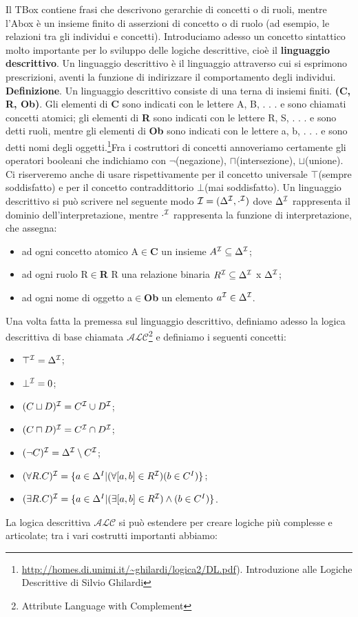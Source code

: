 \documentclass[a4paper,11pt]{article}
\newcommand{\alc}{%
   \ensuremath{\mathcal{ALC}}\xspace}
\newcommand{\I}{%
        \ensuremath{\mathcal{I}}\xspace}
\begin{document}
Il TBox contiene frasi che descrivono gerarchie di concetti o di ruoli, mentre l'Abox è un insieme finito di asserzioni di concetto o di ruolo (ad esempio, le relazioni tra gli individui e concetti).
Introduciamo adesso un concetto sintattico molto importante per lo sviluppo delle logiche descrittive, cioè il \textbf{linguaggio descrittivo}.
Un linguaggio descrittivo è il linguaggio attraverso cui si esprimono prescrizioni, aventi la funzione di indirizzare il comportamento degli individui. \newline
\textbf{Definizione}. \newline Un linguaggio descrittivo consiste di una terna di insiemi finiti. \textbf{(C, R, Ob)}. Gli elementi di \textbf{C} sono indicati con le lettere A, B, . . . e sono chiamati concetti atomici; gli elementi di \textbf{R} sono indicati con le lettere R, S, . . . e sono detti
ruoli, mentre gli elementi di \textbf{Ob} sono indicati con le lettere a, b, . . . e sono detti nomi degli oggetti.\footnote{ \url{http://homes.di.unimi.it/~ghilardi/logica2/DL.pdf}). Introduzione alle Logiche Descrittive di Silvio Ghilardi}\newpage Fra i costruttori di concetti annoveriamo certamente gli operatori booleani che indichiamo con $\neg$(negazione), $\sqcap$(intersezione), $\sqcup$(unione). \newline Ci riserveremo anche di usare rispettivamente per il concetto universale $\top$(sempre soddisfatto) e  per il concetto contraddittorio $\bot$(mai soddisfatto).\newline
Un linguaggio descrittivo si può scrivere nel seguente modo $\I = (\Delta^\I,\cdot^\I)$ dove $\Delta^\I$ rappresenta il dominio dell'interpretazione, 
mentre $\cdot^\I$ rappresenta la funzione di interpretazione, che assegna:
\begin{itemize}
	\item ad ogni concetto atomico A$\in$\textbf{C} un insieme  $A^{\I}\subseteq \Delta^\I$;
	\item ad ogni ruolo R$\in$\textbf{R} R una relazione binaria $R^{\I}\subseteq 	\Delta^{\I}$ x $\Delta^{\I} $;
	\item ad ogni nome di oggetto a$\in$\textbf{Ob} un elemento $a^{\I}\in \Delta^\I$.
\end{itemize}  Una volta fatta la premessa sul linguaggio descrittivo, definiamo adesso la logica descrittiva di base chiamata $\alc$\footnote{Attribute Language with Complement} e definiamo i seguenti concetti:
\begin{itemize}
\item $\top^{\I}=\Delta^\I$;
\item $\bot^{\I}=0$;
\item $(C \sqcup  D)^{\I}=C^{\I} \cup D^{\I}$;
\item $(C \sqcap  D)^{\I}=C^{\I} \cap D^{\I}$;
\item $(\neg C)^{\I}=\Delta^{\I} \setminus C^{\I}$;
\item $(\forall R.C)^{\I}=\{a \in \Delta^{I} | (\forall[a,b] \in R^{\I}) (b \in C^{I})\}$;
\item $(\exists R.C)^{\I}=\{a \in \Delta^{I} | (\exists[a,b] \in R^{\I})\wedge (b \in C^{I})\}$.
\end{itemize} La logica descrittiva $\alc$ si può estendere per creare logiche più complesse e articolate; tra i vari costrutti importanti abbiamo:
\end{document}
